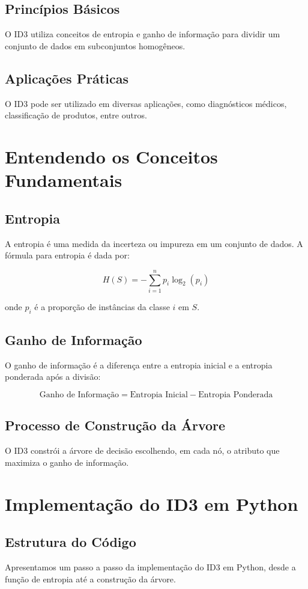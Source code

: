 \documentclass{article}
\begin{document}
\subsection{Princípios Básicos}
O ID3 utiliza conceitos de entropia e ganho de informação para dividir um conjunto de dados em subconjuntos homogêneos.

\subsection{Aplicações Práticas}
O ID3 pode ser utilizado em diversas aplicações, como diagnósticos médicos, classificação de produtos, entre outros.

\section{Entendendo os Conceitos Fundamentais}
\subsection{Entropia}
A entropia é uma medida da incerteza ou impureza em um conjunto de dados. A fórmula para entropia é dada por:

\[
H(S) = -\sum_{i=1}^{n} p_i \log_2(p_i)
\]

onde \(p_i\) é a proporção de instâncias da classe \(i\) em \(S\).

\subsection{Ganho de Informação}
O ganho de informação é a diferença entre a entropia inicial e a entropia ponderada após a divisão:

\[
\text{Ganho de Informação} = \text{Entropia Inicial} - \text{Entropia Ponderada}
\]

\subsection{Processo de Construção da Árvore}
O ID3 constrói a árvore de decisão escolhendo, em cada nó, o atributo que maximiza o ganho de informação.

\section{Implementação do ID3 em Python}
\subsection{Estrutura do Código}
Apresentamos um passo a passo da implementação do ID3 em Python, desde a função de entropia até a construção da árvore.
\end{document}
